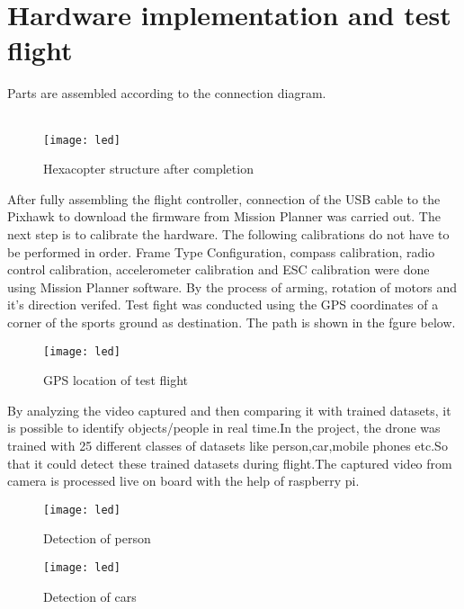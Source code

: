 \documentclass[12pt,a4paper]{report}
\begin{document}
\section{Hardware implementation and test flight}

\hspace*{1cm} Parts are assembled according to the connection diagram. \\\\

\begin{figure}[h!]
\centering
\texttt{[image: led]}
\caption{Hexacopter structure after completion}
\label{circuit}
\end{figure}

\newpage
\hspace*{1cm} After fully assembling the flight controller, connection of the USB cable to the Pixhawk to download the firmware from Mission Planner was carried out. 
 The next step is to calibrate the hardware. The following calibrations do not have to be performed in order.
Frame Type Configuration, compass calibration, radio control calibration, accelerometer calibration and ESC calibration were done using Mission Planner software.
 By the process of arming, rotation of motors
and it's direction verifed. Test 
fight was conducted using the GPS coordinates of a
corner of the sports ground as destination. The path is shown in the fgure below.
\begin{figure}[h!]
\centering
\texttt{[image: led]}
\caption{GPS location of test flight}
\label{circuit}
\end{figure}

By analyzing the video captured and then comparing it with trained datasets, it is possible to identify objects/people in real time.In the project, the drone was trained with 25 different classes of datasets like person,car,mobile phones etc.So that it could detect these trained datasets during flight.The captured video from camera is processed live on board with the help of raspberry pi.

\begin{figure}[h!]
\centering
\texttt{[image: led]}
\caption{Detection of person}
\label{circuit}
\end{figure}

\begin{figure}[h!]
\centering
\texttt{[image: led]}
\caption{Detection of cars}
\label{circuit}
\end{figure}
\end{document}

